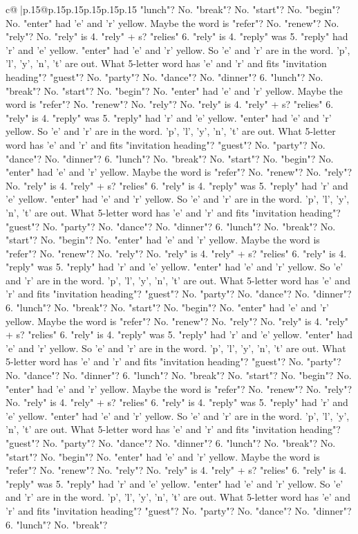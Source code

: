 \documentclass{article}
\begin{document}
{\begin{supertabular}{c@{$\;$}|p{.15\linewidth}@{}p{.15\linewidth}p{.15\linewidth}p{.15\linewidth}p{.15\linewidth}p{.15\linewidth}}
{{{"lunch"? No. "break"? No. "start"? No. "begin"? No. "enter" had 'e' and 'r' yellow. Maybe the word is "refer"? No. "renew"? No. "rely"? No. "rely" is 4. "rely" + s? "relies" 6. "rely" is 4. "reply" was 5. "reply" had 'r' and 'e' yellow. "enter" had 'e' and 'r' yellow. So 'e' and 'r' are in the word. 'p', 'l', 'y', 'n', 't' are out. What 5{-}letter word has 'e' and 'r' and fits "invitation heading"? "guest"? No. "party"? No. "dance"? No. "dinner"? 6. "lunch"? No. "break"? No. "start"? No. "begin"? No. "enter" had 'e' and 'r' yellow. Maybe the word is "refer"? No. "renew"? No. "rely"? No. "rely" is 4. "rely" + s? "relies" 6. "rely" is 4. "reply" was 5. "reply" had 'r' and 'e' yellow. "enter" had 'e' and 'r' yellow. So 'e' and 'r' are in the word. 'p', 'l', 'y', 'n', 't' are out. What 5{-}letter word has 'e' and 'r' and fits "invitation heading"? "guest"? No. "party"? No. "dance"? No. "dinner"? 6. "lunch"? No. "break"? No. "start"? No. "begin"? No. "enter" had 'e' and 'r' yellow. Maybe the word is "refer"? No. "renew"? No. "rely"? No. "rely" is 4. "rely" + s? "relies" 6. "rely" is 4. "reply" was 5. "reply" had 'r' and 'e' yellow. "enter" had 'e' and 'r' yellow. So 'e' and 'r' are in the word. 'p', 'l', 'y', 'n', 't' are out. What 5{-}letter word has 'e' and 'r' and fits "invitation heading"? "guest"? No. "party"? No. "dance"? No. "dinner"? 6. "lunch"? No. "break"? No. "start"? No. "begin"? No. "enter" had 'e' and 'r' yellow. Maybe the word is "refer"? No. "renew"? No. "rely"? No. "rely" is 4. "rely" + s? "relies" 6. "rely" is 4. "reply" was 5. "reply" had 'r' and 'e' yellow. "enter" had 'e' and 'r' yellow. So 'e' and 'r' are in the word. 'p', 'l', 'y', 'n', 't' are out. What 5{-}letter word has 'e' and 'r' and fits "invitation heading"? "guest"? No. "party"? No. "dance"? No. "dinner"? 6. "lunch"? No. "break"? No. "start"? No. "begin"? No. "enter" had 'e' and 'r' yellow. Maybe the word is "refer"? No. "renew"? No. "rely"? No. "rely" is 4. "rely" + s? "relies" 6. "rely" is 4. "reply" was 5. "reply" had 'r' and 'e' yellow. "enter" had 'e' and 'r' yellow. So 'e' and 'r' are in the word. 'p', 'l', 'y', 'n', 't' are out. What 5{-}letter word has 'e' and 'r' and fits "invitation heading"? "guest"? No. "party"? No. "dance"? No. "dinner"? 6. "lunch"? No. "break"? No. "start"? No. "begin"? No. "enter" had 'e' and 'r' yellow. Maybe the word is "refer"? No. "renew"? No. "rely"? No. "rely" is 4. "rely" + s? "relies" 6. "rely" is 4. "reply" was 5. "reply" had 'r' and 'e' yellow. "enter" had 'e' and 'r' yellow. So 'e' and 'r' are in the word. 'p', 'l', 'y', 'n', 't' are out. What 5{-}letter word has 'e' and 'r' and fits "invitation heading"? "guest"? No. "party"? No. "dance"? No. "dinner"? 6. "lunch"? No. "break"? No. "start"? No. "begin"? No. "enter" had 'e' and 'r' yellow. Maybe the word is "refer"? No. "renew"? No. "rely"? No. "rely" is 4. "rely" + s? "relies" 6. "rely" is 4. "reply" was 5. "reply" had 'r' and 'e' yellow. "enter" had 'e' and 'r' yellow. So 'e' and 'r' are in the word. 'p', 'l', 'y', 'n', 't' are out. What 5{-}letter word has 'e' and 'r' and fits "invitation heading"? "guest"? No. "party"? No. "dance"? No. "dinner"? 6. "lunch"? No. "break"? }}}
\end{supertabular}}
\end{document}
